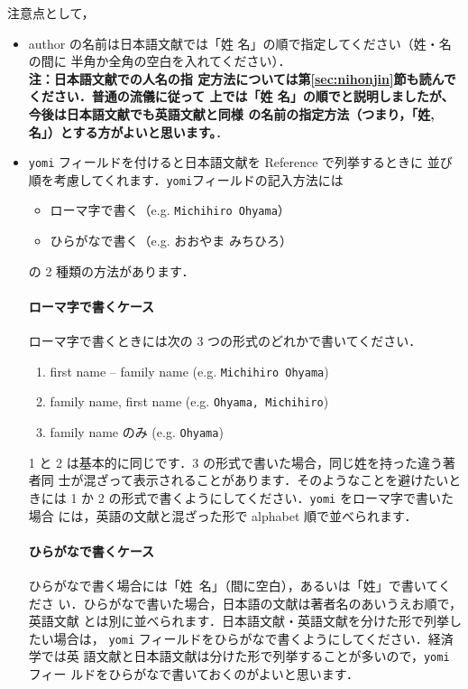 \documentclass[a4j,10pt]{jarticle}
\begin{document}
注意点として，
\begin{itemize}
\item author の名前は日本語文献では「姓 名」の順で指定してください（姓・名の間に
      半角か全角の空白を入れてください）．\\ \textbf{注：日本語文献での人名の指
      定方法については第\ref{sec:nihonjin}節も読んでください．普通の流儀に従って
      上では「姓 名」の順でと説明しましたが、今後は日本語文献でも英語文献と同様
      の名前の指定方法（つまり，「姓, 名」）とする方がよいと思います。}．
 \item \texttt{yomi} フィールドを付けると日本語文献を Reference で列挙するときに
      並び順を考慮してくれます．\texttt{yomi}フィールドの記入方法には
       \begin{itemize}
        \item ローマ字で書く（e.g. \texttt{Michihiro Ohyama}）
        \item ひらがなで書く（e.g. おおやま みちひろ）
       \end{itemize}
       の 2 種類の方法があります．

       \paragraph{ローマ字で書くケース}
       ローマ字で書くときには次の 3 つの形式のどれかで書いてください．
       \begin{enumerate}
        \item first name -- family name (e.g. \texttt{Michihiro Ohyama})
        \item family name, first name (e.g. \texttt{Ohyama, Michihiro})
        \item family name のみ (e.g. \texttt{Ohyama})
       \end{enumerate}
       1 と 2 は基本的に同じです．3 の形式で書いた場合，同じ姓を持った違う著者同
       士が混ざって表示されることがあります．そのようなことを避けたいときには 1
       か 2 の形式で書くようにしてください．\texttt{yomi} をローマ字で書いた場合
       には，英語の文献と混ざった形で alphabet 順で並べられます．

       \paragraph{ひらがなで書くケース}
       ひらがなで書く場合には「姓\ 名」（間に空白），あるいは「姓」で書いてくださ
       い．ひらがなで書いた場合，日本語の文献は著者名のあいうえお順で，英語文献
       とは別に並べられます．日本語文献・英語文献を分けた形で列挙したい場合は，
       \texttt{yomi} フィールドをひらがなで書くようにしてください．経済学では英
       語文献と日本語文献は分けた形で列挙することが多いので，\texttt{yomi} フィー
       ルドをひらがなで書いておくのがよいと思います．


\end{itemize}
\end{document}
